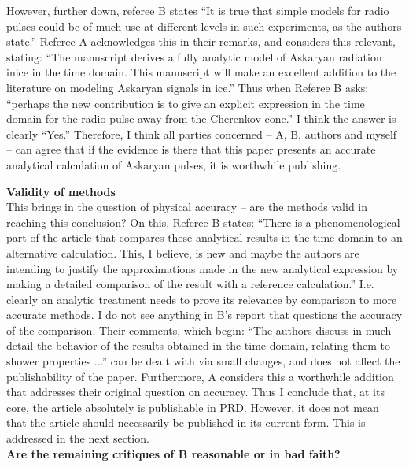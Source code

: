 \documentclass[12pt]{article}
\begin{document}
However, further down, referee B states ``It is true that simple models for radio pulses could be of much use at different levels in such experiments, as the authors state.''  Referee A acknowledges this in their remarks, and considers this relevant, stating: ``The manuscript derives a fully analytic model of Askaryan radiation inice in the time domain. This manuscript will make an excellent addition to the literature on modeling Askaryan signals in ice.'' Thus when Referee B asks: ``perhaps the new contribution is to give an explicit expression in the time domain for the radio pulse away from the Cherenkov cone.''  I think the answer is clearly ``Yes.'' Therefore, I think all parties concerned – A, B, authors and myself – can agree that if the evidence is there that this paper presents an accurate analytical calculation of Askaryan pulses, it is worthwhile publishing.

\clearpage

\textbf{Validity of methods} \\

This brings in the question of physical accuracy – are the methods valid in reaching this conclusion?  On this, Referee B states: ``There is a phenomenological part of the article that compares these analytical results in the time domain to an alternative calculation. This, I believe, is new and maybe the authors are intending to justify the approximations made in the new analytical expression by making a detailed comparison of the result with a reference calculation.'' I.e. clearly an analytic treatment needs to prove its relevance by comparison to more accurate methods.  I do not see anything in B’s report that questions the accuracy of the comparison. Their comments, which begin: ``The authors discuss in much detail the behavior of the results obtained in the time domain, relating them to shower properties ...'' can be dealt with via small changes, and does not affect the publishability of the paper.  Furthermore, A considers this a worthwhile addition that addresses their original question on accuracy. Thus I conclude that, at its core, the article absolutely is publishable in PRD.  However, it does not mean that the article should necessarily be published in its current form. This is addressed in the next section. \\

\textbf{Are the remaining critiques of B reasonable or in bad faith?} \\
\end{document}
